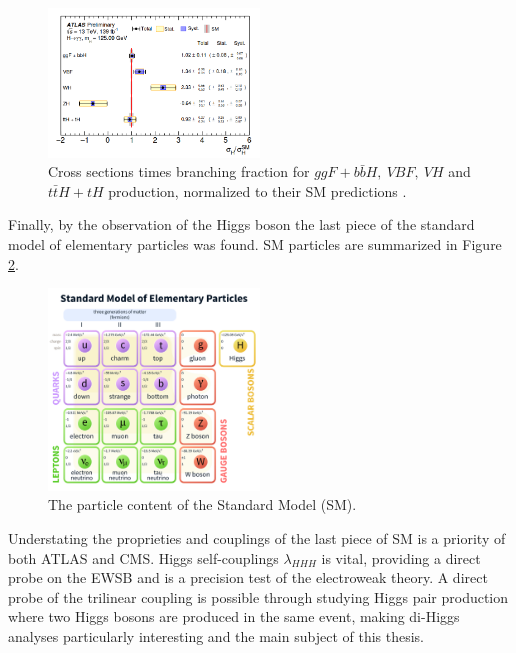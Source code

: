 \begin{figure}[htbp]
    \centering
    \includegraphics[width=0.5\textwidth]{Ch1/Img/HXsecRun2.png}
    \caption{Cross sections times branching fraction for $ggF+b\bar{b}H , \ VBF, \ VH$ and $t\bar{t}H + tH$ production, normalized to their SM predictions \cite{ATLAS_2020}.}
    \label{fig:chap1:H2012:HXsecRun2}
\end{figure}
Finally, by the observation of the Higgs boson the last piece of the standard model of elementary particles was found. SM particles are summarized in Figure \ref{fig:chap1:H2012:SM}.
\begin{figure}[htbp]
    \centering
    \includegraphics[width=0.5\textwidth]{Ch1/Img/SM_particles.png}
    \caption{The particle content of the Standard Model (SM).}
    \label{fig:chap1:H2012:SM}
\end{figure}
Understating the proprieties and couplings of the last piece of SM is a priority of both ATLAS and CMS. Higgs self-couplings $\lambda_{HHH}$ is vital, providing a direct probe on the EWSB and is a precision test of the electroweak theory. A direct probe of the trilinear coupling is possible through studying Higgs pair production where two Higgs bosons are produced in the same event, making di-Higgs analyses particularly interesting and the main subject of this thesis.

